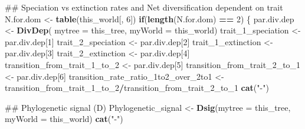 \documentclass[]{book}
\newenvironment{Shaded}{\begin{snugshade}}{\end{snugshade}}
\newcommand{\KeywordTok}[1]{\textcolor[rgb]{0.13,0.29,0.53}{\textbf{{#1}}}}
\newcommand{\DataTypeTok}[1]{\textcolor[rgb]{0.13,0.29,0.53}{{#1}}}
\newcommand{\DecValTok}[1]{\textcolor[rgb]{0.00,0.00,0.81}{{#1}}}
\newcommand{\StringTok}[1]{\textcolor[rgb]{0.31,0.60,0.02}{{#1}}}
\newcommand{\ControlFlowTok}[1]{\textcolor[rgb]{0.13,0.29,0.53}{\textbf{{#1}}}}
\newcommand{\OperatorTok}[1]{\textcolor[rgb]{0.81,0.36,0.00}{\textbf{{#1}}}}
\newcommand{\NormalTok}[1]{{#1}}
\theoremstyle{definition}
\theoremstyle{definition}
\theoremstyle{remark}
\begin{document}
\begin{Shaded}
\begin{Highlighting}[]
{\NormalTok{    ## Speciation vs extinction rates and Net diversification dependent on trait}
\NormalTok{    N.for.dom <-}\StringTok{ }\KeywordTok{table}\NormalTok{(this_world[, }\DecValTok{6}\NormalTok{])}
    \ControlFlowTok{if}\NormalTok{(}\KeywordTok{length}\NormalTok{(N.for.dom) }\OperatorTok{==}\StringTok{ }\DecValTok{2}\NormalTok{) \{}
\NormalTok{      par.div.dep <-}\StringTok{ }\KeywordTok{DivDep}\NormalTok{( }\DataTypeTok{mytree =}\NormalTok{ this_tree, }\DataTypeTok{myWorld =}\NormalTok{ this_world)}
\NormalTok{      trait_1_speciation <-}\StringTok{ }\NormalTok{par.div.dep[}\DecValTok{1}\NormalTok{]}
\NormalTok{      trait_2_speciation <-}\StringTok{ }\NormalTok{par.div.dep[}\DecValTok{2}\NormalTok{]}
\NormalTok{      trait_1_extinction <-}\StringTok{ }\NormalTok{par.div.dep[}\DecValTok{3}\NormalTok{]}
\NormalTok{      trait_2_extinction <-}\StringTok{ }\NormalTok{par.div.dep[}\DecValTok{4}\NormalTok{]}
\NormalTok{      transition_from_trait_1_to_}\DecValTok{2}\NormalTok{ <-}\StringTok{ }\NormalTok{par.div.dep[}\DecValTok{5}\NormalTok{]}
\NormalTok{      transition_from_trait_2_to_}\DecValTok{1}\NormalTok{ <-}\StringTok{ }\NormalTok{par.div.dep[}\DecValTok{6}\NormalTok{]}
\NormalTok{      transition_rate_ratio_1to2_over_2to1 <-}\StringTok{ }\NormalTok{transition_from_trait_1_to_}\DecValTok{2}\OperatorTok{/}\NormalTok{transition_from_trait_2_to_}\DecValTok{1}
      \KeywordTok{cat}\NormalTok{(}\StringTok{"-"}\NormalTok{)}

\NormalTok{      ## Phylogenetic signal (D)}
\NormalTok{      Phylogenetic_signal <-}\StringTok{ }\KeywordTok{Dsig}\NormalTok{(}\DataTypeTok{mytree =}\NormalTok{ this_tree, }\DataTypeTok{myWorld =}\NormalTok{ this_world)}
      \KeywordTok{cat}\NormalTok{(}\StringTok{"-"}\NormalTok{)}

}
\end{Highlighting}
\end{Shaded}
\end{document}
